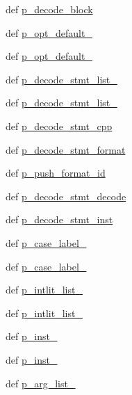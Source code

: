 \begin{DoxyCompactItemize}
\item 
def \hyperlink{classisa__parser_1_1ISAParser_a6c5a58df0a6f0b0978e6afb22a37444c}{p\_\-decode\_\-block}
\item 
def \hyperlink{classisa__parser_1_1ISAParser_ab46371ade3facb8510c3aa644d77bc5a}{p\_\-opt\_\-default\_}
\item 
def \hyperlink{classisa__parser_1_1ISAParser_a33c801c6d0fa29ce3a49089e3968f81c}{p\_\-opt\_\-default\_}
\item 
def \hyperlink{classisa__parser_1_1ISAParser_a1f89215837def287e1a5b4ba5edd7523}{p\_\-decode\_\-stmt\_\-list\_}
\item 
def \hyperlink{classisa__parser_1_1ISAParser_a006ed8d0eb79f0b238e120cbf5cf752c}{p\_\-decode\_\-stmt\_\-list\_}
\item 
def \hyperlink{classisa__parser_1_1ISAParser_a906497e3aab08ad0577f3660ba2ffa8b}{p\_\-decode\_\-stmt\_\-cpp}
\item 
def \hyperlink{classisa__parser_1_1ISAParser_a6646bac7601746202a0c7902a94c0f7c}{p\_\-decode\_\-stmt\_\-format}
\item 
def \hyperlink{classisa__parser_1_1ISAParser_a5d4cae9753ae8b3e873a5ea3317b0799}{p\_\-push\_\-format\_\-id}
\item 
def \hyperlink{classisa__parser_1_1ISAParser_a732b3446dd057bbebee6335a648af7e5}{p\_\-decode\_\-stmt\_\-decode}
\item 
def \hyperlink{classisa__parser_1_1ISAParser_a129b6cf7f6a052f67fb554c6aef9b997}{p\_\-decode\_\-stmt\_\-inst}
\item 
def \hyperlink{classisa__parser_1_1ISAParser_a699cea1c54c1f747f671b33450b39439}{p\_\-case\_\-label\_}
\item 
def \hyperlink{classisa__parser_1_1ISAParser_a8cdd774d2dbf5d6d58b463d80c3dab3a}{p\_\-case\_\-label\_}
\item 
def \hyperlink{classisa__parser_1_1ISAParser_abad174497eba2f447149c2daa703c869}{p\_\-intlit\_\-list\_}
\item 
def \hyperlink{classisa__parser_1_1ISAParser_a0e79a297e16a53adc6321ed5e30cc04a}{p\_\-intlit\_\-list\_}
\item 
def \hyperlink{classisa__parser_1_1ISAParser_a0b0c46f13751ae97e4613c111feb0f11}{p\_\-inst\_}
\item 
def \hyperlink{classisa__parser_1_1ISAParser_ab3843884ee52e3b3cbd5bbfe89fe5573}{p\_\-inst\_}
\item 
def \hyperlink{classisa__parser_1_1ISAParser_a4048a5c0b52149895015080981d56fd4}{p\_\-arg\_\-list\_}

\end{DoxyCompactItemize}
